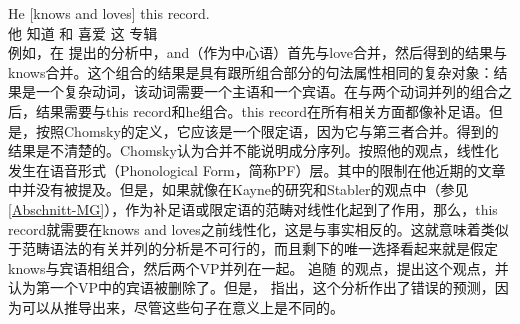 
\addlines
\ea
\label{ex-he-knows-and-loves-this-record-MP}
\gll He [knows and loves] this record.\\
     他 \spacebr{}知道 和 喜爱 这 专辑\\
\z
例如，在 \citet[]{Steedman91a}提出的分析中，and（作为中心语）首先与love合并，然后得到的结果与knows合并。这个组合的结果是具有跟所组合部分的句法属性相同的复杂对象：结果是一个复杂动词，该动词需要一个主语和一个宾语。在与两个动词并列的组合之后，结果需要与this record和he组合。this record在所有相关方面都像补足语。但是，按照Chomsky的定义，它应该是一个限定语，因为它与第三者合并。得到的结果是不清楚的。Chomsky认为合并不能说明成分序列。按照他的观点，线性化发生在语音形式（Phonological
    Form，简称PF）层。其中的限制在他近期的文章中并没有被提及。但是，如果就像在Kayne的研究和Stabler的观点中（参见\ref{Abschnitt-MG}），作为补足语或限定语的范畴对线性化起到了作用，那么，this record就需要在knows and loves之前线性化，这是与事实相反的。这就意味着类似于范畴语法的有关并列的分析是不可行的，而且剩下的唯一选择看起来就是假定knows与宾语相组合，然后两个VP并列在一起。 \citet[, 67]{Kayne94a-u}追随 \citet[]{WC80a-u}的观点，提出这个观点，并认为第一个VP中的宾语被删除了。但是， \citet[]{Borsley2005a}指出，这个分析作出了错误的预测，因为可以从推导出来，尽管这些句子在意义上是不同的。
